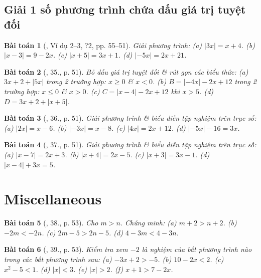 \documentclass{article}
\newtheorem{baitoan}{Bài toán}
\begin{document}
\subsection{Giải 1 số phương trình chứa dấu giá trị tuyệt đối}

\begin{baitoan}[\cite{SGK_Toan_8_tap_2}, Ví dụ 2--3, ?2, pp. 55--51]
	Giải phương trình: (a) $|3x| = x + 4$. (b) $|x - 3| = 9 - 2x$. (c) $|x + 5| = 3x + 1$. (d) $|-5x| = 2x + 21$.
\end{baitoan}

\begin{baitoan}[\cite{SGK_Toan_8_tap_2}, 35., p. 51]
	Bỏ dấu giá trị tuyệt đối \& rút gọn các biểu thức: (a) $3x + 2 + |5x|$ trong 2 trường hợp: $x\ge0$ \& $x < 0$. (b) $B = |-4x| - 2x + 12$ trong 2 trường hợp: $x\le0$ \& $x > 0$. (c) $C = |x - 4| - 2x + 12$ khi $x > 5$. (d) $D = 3x + 2 + |x + 5|$.
\end{baitoan}

\begin{baitoan}[\cite{SGK_Toan_8_tap_2}, 36., p. 51]
	Giải phương trình \& biểu diễn tập nghiệm trên trục số: (a) $|2x| = x - 6$. (b) $|-3x| = x - 8$. (c) $|4x| = 2x + 12$. (d) $|-5x| - 16 = 3x$.
\end{baitoan}

\begin{baitoan}[\cite{SGK_Toan_8_tap_2}, 37., p. 51]
	Giải phương trình \& biểu diễn tập nghiệm trên trục số: (a) $|x - 7| = 2x + 3$. (b) $|x + 4| = 2x - 5$. (c) $|x + 3| = 3x - 1$. (d) $|x - 4| + 3x = 5$.
\end{baitoan}


\section{Miscellaneous}

\begin{baitoan}[\cite{SGK_Toan_8_tap_2}, 38., p. 53]
	Cho $m > n$. Chứng minh: (a) $m + 2 > n + 2$. (b) $-2m < -2n$. (c) $2m - 5 > 2n - 5$. (d) $4 - 3m < 4 - 3n$.
\end{baitoan}

\begin{baitoan}[\cite{SGK_Toan_8_tap_2}, 39., p. 53]
	Kiểm tra xem $-2$ là nghiệm của bất phương trình nào trong các bất phương trình sau: (a) $-3x + 2 > -5$. (b) $10 - 2x < 2$. (c) $x^2 - 5 < 1$. (d) $|x| < 3$. (e) $|x| > 2$. (f) $x + 1 > 7 - 2x$.
\end{baitoan}
\end{document}

